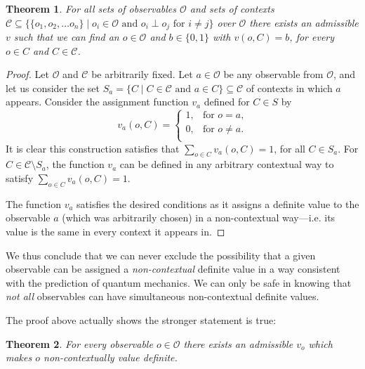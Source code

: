 \documentclass[11pt, a4paper]{article}
\newtheorem{Theorem}{Theorem}
\theoremstyle{definition}
\begin{document}
\begin{Theorem}
\label{nostrongcontextuality}
	For all  sets of observables $\mathcal{O}$ and sets of contexts $\mathcal{C}\subseteq \{\{o_1,o_2,\dots o_n\} \mid o_i \in \mathcal{O} \text{ and } o_i\perp o_j \text{ for } i\neq j \}$ over $\mathcal{O}$ there exists an admissible $v$ such that we can find an $o\in \mathcal{O}$ and $ b\in\{0,1\}$ with $v(o,C)=b$, for every  $o\in C $ and $C\in\mathcal{C}$.
\end{Theorem}

\begin{proof}
	Let $\mathcal{O}$ and $\mathcal{C}$ be arbitrarily fixed.
	Let $a\in\mathcal{O}$ be any observable from $\mathcal{O}$, and let us consider the set $S_{a}=\{C \mid C\in \mathcal{C} \text{ and } a \in C \}\subseteq \mathcal{C}$ of contexts in which $a$ appears.
	Consider the assignment function $v_{a}$ defined for $C\in S$ by
	\begin{equation*}
		v_{a}(o,C) =
		\begin{cases}
			1, & \text{for $o=a$,}\\
			0, & \text{for  $o\neq a$.}\\
		\end{cases}
	\end{equation*}
	It is clear this construction satisfies that $ \sum_{o\in C}v_{a}(o,C)=1$, for all $C\in S_{a}$. For $C\in \mathcal{C}\setminus S_{a}$, the function $v_{a}$ can be defined in any arbitrary contextual way to satisfy $\sum_{o\in C}v_{a}(o,C)=1$.
	
	The function $v_{a}$ satisfies the desired conditions as it assigns a definite value to the observable $a$ (which was arbitrarily chosen) in a non-contextual way---i.e. its value is the same in every context it appears in.
\end{proof}

We thus conclude that we can never exclude the possibility that a given observable can be assigned a \emph{non-contextual} definite value in a way consistent with the prediction of quantum mechanics.
We can only be safe in knowing that \emph{not all} observables can have simultaneous non-contextual definite values.


	The proof above actually shows the stronger statement is true: \\
	
	\begin{Theorem}
	For every observable $o\in\mathcal{O}$ there exists an admissible $v_{o}$ which makes $o$ non-contextually value definite.
\end{Theorem}
\end{document}
